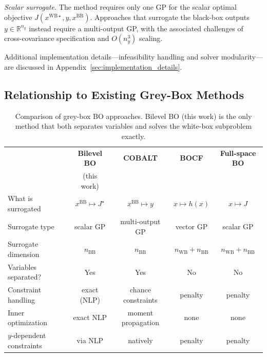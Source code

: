 \documentclass[12pt,a4paper]{article}%
\theoremstyle{plain}%
\theoremstyle{remark}%
\theoremstyle{definition}%
\def\WB{\mathrm{WB}}
\def\BB{\mathrm{BB}}
\begin{document}
\emph{Scalar surrogate.} The method requires only one GP for the scalar optimal objective $J(x^{\WB\star}, y, x^{\BB})$. Approaches that surrogate the black-box outputs $y \in \mathbb{R}^{n_y}$ instead require a multi-output GP, with the associated challenges of cross-covariance specification and $O(n_y^3)$ scaling.

Additional implementation details---infeasibility handling and solver modularity---are discussed in Appendix~\ref{sec:implementation_details}.

\subsection{Relationship to Existing Grey-Box Methods}\label{subsec:contrast_greybox_approaches}

\begin{table}[htbp]
\centering
\caption{Comparison of grey-box BO approaches. Bilevel BO (this work) is the only method that both separates variables and solves the white-box subproblem exactly.}
\label{tab:method_comparison}
\begin{tabular}{@{}lcccc@{}}
\toprule
& \textbf{Bilevel BO} & \textbf{COBALT} & \textbf{BOCF} & \textbf{Full-space BO} \\
& (this work) & \cite{paulson2022cobalt} & \cite{astudillo2019bocf} & \\
\midrule
What is surrogated & $x^{\BB} \mapsto J^\star$ & $x^{\BB} \mapsto y$ & $x \mapsto h(x)$ & $x \mapsto J$ \\
Surrogate type & scalar GP & multi-output GP & vector GP & scalar GP \\
Surrogate dimension & $n_{\BB}$ & $n_{\BB}$ & $n_{\WB}+n_{\BB}$ & $n_{\WB}+n_{\BB}$ \\
Variables separated? & Yes & Yes & No & No \\
Constraint handling & exact (NLP) & chance constraints & penalty & penalty \\
Inner optimization & exact NLP & moment propagation & none & none \\
$y$-dependent constraints & via NLP & natively & penalty & penalty \\
\bottomrule
\end{tabular}
\end{table}
\end{document}

